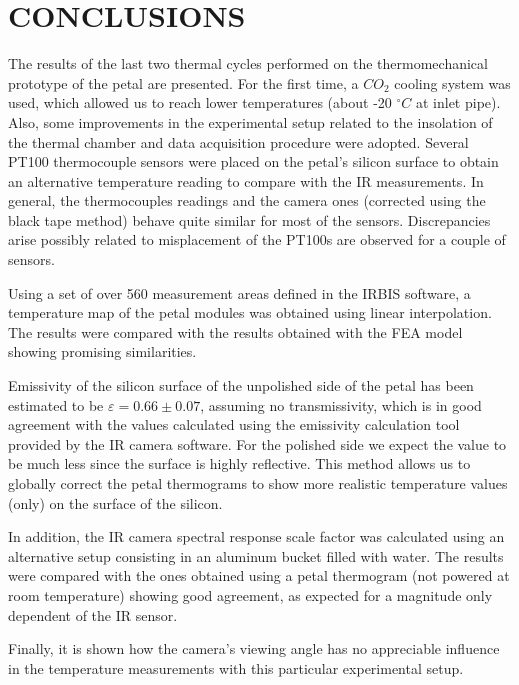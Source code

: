 \pagestyle{conclusions}

\section*{\uppercase{Conclusions}}\label{concl}
	\bigskip
	\bigskip
	The results of the last two thermal cycles performed on the thermomechanical prototype of the petal are presented. For the first time, a $CO_{2}$ cooling system was used, which allowed us to reach lower temperatures (about -20 $^\circ C$ at inlet pipe). Also, some improvements in the experimental setup related to the insolation of the thermal chamber and data acquisition procedure were adopted. Several PT100 thermocouple sensors were placed on the petal’s silicon surface to obtain an alternative temperature reading to compare with the IR measurements. In general, the thermocouples readings and the camera ones (corrected using the black tape method) behave quite similar for most of the sensors. Discrepancies arise possibly related to misplacement of the PT100s are observed for a couple of sensors.
	
	Using a set of over 560 measurement areas defined in the IRBIS software, a temperature map of the petal modules was obtained using linear interpolation. The results were compared with the results obtained with the FEA model showing promising similarities.
	
	Emissivity of the silicon surface of the unpolished side of the petal has been estimated to be $\varepsilon=0.66 \pm 0.07$, assuming no transmissivity, which is in good agreement with the values calculated using the emissivity calculation tool provided by the IR camera software. For the polished side we expect the value to be much less since the surface is highly reflective. This method allows us to globally correct the petal thermograms to show more realistic temperature values (only) on the surface of the silicon. 
	
	In addition, the IR camera spectral response scale factor was calculated using an alternative setup consisting in an aluminum bucket filled with water. The results were compared with the ones obtained using a petal thermogram (not powered at room temperature) showing good agreement, as expected for a magnitude only dependent of the IR sensor.
	
	Finally, it is shown how the camera’s viewing angle has no appreciable influence in the temperature measurements with this particular experimental setup.
	 
	